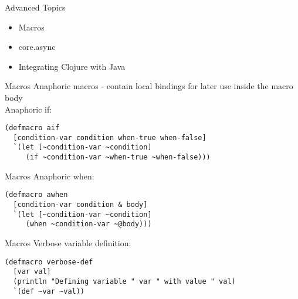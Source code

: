 \documentclass[pdf]{beamer}
\begin{document}
\begin{frame}{Advanced Topics}
  \begin{itemize}
  \item Macros
    \pause
  \item core.async
    \pause
  \item Integrating Clojure with Java
  \end{itemize}
\end{frame}

\begin{frame}[fragile]{Macros}
  Anaphoric macros - contain local bindings for later use inside the macro body\\
  \pause
  Anaphoric if:
  \pause
\begin{verbatim}
(defmacro aif
  [condition-var condition when-true when-false]
  `(let [~condition-var ~condition]
     (if ~condition-var ~when-true ~when-false)))
\end{verbatim}
\end{frame}

\begin{frame}[fragile]{Macros}
  Anaphoric when:
  \pause
\begin{verbatim}
(defmacro awhen
  [condition-var condition & body]
  `(let [~condition-var ~condition]
     (when ~condition-var ~@body)))
\end{verbatim}
\end{frame}

\begin{frame}[fragile]{Macros}
  Verbose variable definition:
  \pause
\begin{verbatim}
(defmacro verbose-def
  [var val]
  (println "Defining variable " var " with value " val)
  `(def ~var ~val))
\end{verbatim}
\end{frame}
\end{document}
